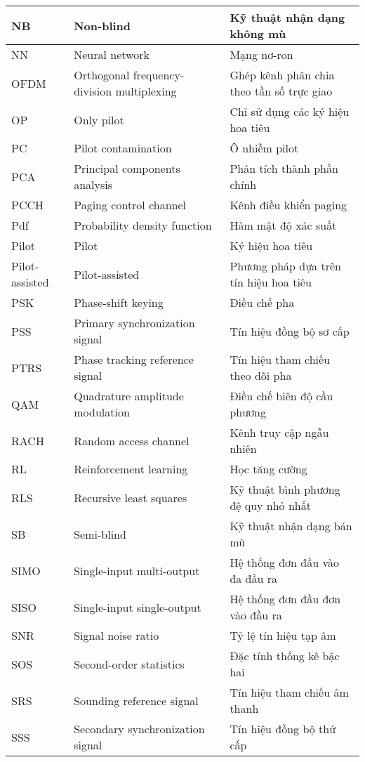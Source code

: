 {{\begin{longtable}{|p{2.35cm}|>{\raggedright}p{6.2cm}|p{5.75cm}|}
\hline
NB & Non-blind & Kỹ thuật nhận dạng không mù \\ 
\hline
NN & Neural network & Mạng nơ-ron \\ 
\hline
OFDM & Orthogonal frequency-division multiplexing & Ghép kênh phân chia theo tần số trực giao \\ 
\hline
OP & Only pilot & Chỉ sử dụng các ký hiệu hoa tiêu \\ 
\hline
PC & Pilot contamination & Ô nhiễm pilot \\ 
\hline
PCA & Principal components analysis & Phân tích thành phần chính \\ 
\hline
PCCH & Paging control channel & Kênh điều khiển paging \\ 
\hline
Pdf & Probability density function & Hàm mật độ xác suất \\ 
\hline
Pilot & Pilot & Ký hiệu hoa tiêu \\ 
\hline
Pilot-assisted & Pilot-assisted & Phương pháp dựa trên tín hiệu hoa tiêu \\ 
\hline
PSK & Phase-shift keying & Điều chế pha \\ 
\hline
PSS & Primary synchronization signal & Tín hiệu đồng bộ sơ cấp \\ 
\hline
PTRS & Phase tracking reference signal & Tín hiệu tham chiếu theo dõi pha \\ 
\hline
QAM & Quadrature amplitude modulation & Điều chế biên độ cầu phương \\ 
\hline
RACH & Random access channel & Kênh truy cập ngẫu nhiên \\ 
\hline
RL & Reinforcement learning & Học tăng cường \\ 
\hline
RLS & Recursive least squares & Kỹ thuật bình phương đệ quy nhỏ nhất \\ 
\hline
SB & Semi-blind & Kỹ thuật nhận dạng bán mù \\ 
\hline
SIMO & Single-input multi-output & Hệ thống đơn đầu vào đa đầu ra \\ 
\hline
SISO & Single-input single-output & Hệ thống đơn đầu đơn vào đầu ra \\ 
\hline
SNR & Signal noise ratio & Tỷ lệ tín hiệu tạp âm \\ 
\hline
SOS & Second-order statistics & Đặc tính thống kê bậc hai \\ 
\hline
SRS & Sounding reference signal & Tín hiệu tham chiếu âm thanh \\ 
\hline
SSS & Secondary synchronization signal & Tín hiệu đồng bộ thứ cấp \\ 

\end{longtable}}}
